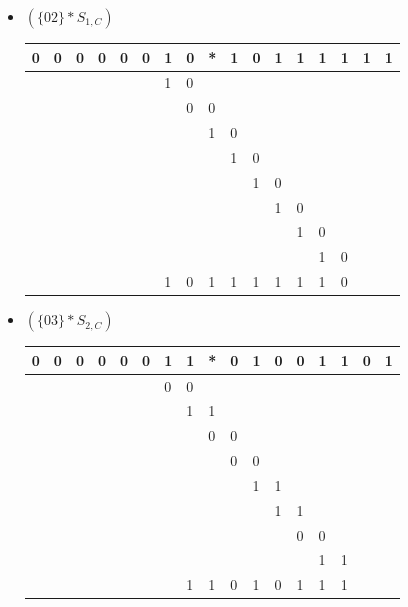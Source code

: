 \begin{itemize}
     \begin{itemize}
         \item $(\{02\} * S_{1,C})$
\begin{center}
\begin{tabular}{lllllllllllllllll}
0 & 0 & 0 & 0 & 0 & 0 & 1 & 0 & * & 1 & 0 & 1 & 1 & 1 & 1 & 1 & 1\\
\hline
 &  &  &  &  &  & 1 & 0 &  &  &  &  &  &  &  &  & \\
 &  &  &  &  &  &  & 0 & 0 &  &  &  &  &  &  &  & \\
 &  &  &  &  &  &  &  & 1 & 0 &  &  &  &  &  &  & \\
 &  &  &  &  &  &  &  &  & 1 & 0 &  &  &  &  &  & \\
 &  &  &  &  &  &  &  &  &  & 1 & 0 &  &  &  &  & \\
 &  &  &  &  &  &  &  &  &  &  & 1 & 0 &  &  &  & \\
 &  &  &  &  &  &  &  &  &  &  &  & 1 & 0 &  &  & \\
 &  &  &  &  &  &  &  &  &  &  &  &  & 1 & 0 &  & \\
 \hline
 &  &  &  &  &  & 1 & 0 & 1 & 1 & 1 & 1 & 1 & 1 & 0 &  & \\
         \end{tabular}
         \end{center}

        \item $(\{03\} * S_{2,C})$
        \begin{center}
\begin{tabular}{lllllllllllllllll}
0 & 0 & 0 & 0 & 0 & 0 & 1 & 1 & * & 0 & 1 & 0 & 0 & 1 & 1 & 0 & 1\\
\hline
 &  &  &  &  &  & 0 & 0 &  &  &  &  &  &  &  &  & \\
 &  &  &  &  &  &  & 1 & 1 &  &  &  &  &  &  &  & \\
 &  &  &  &  &  &  &  & 0 & 0 &  &  &  &  &  &  & \\
 &  &  &  &  &  &  &  &  & 0 & 0 &  &  &  &  &  & \\
 &  &  &  &  &  &  &  &  &  & 1 & 1 &  &  &  &  & \\
 &  &  &  &  &  &  &  &  &  &  & 1 & 1 &  &  &  & \\
 &  &  &  &  &  &  &  &  &  &  &  & 0 & 0 &  &  & \\
 &  &  &  &  &  &  &  &  &  &  &  &  & 1 & 1 &  & \\
 \hline
 &  &  &  &  &  &  & 1 & 1 & 0 & 1 & 0 & 1 & 1 & 1 &  &
         \end{tabular}
         \end{center}
       \end{itemize}


\end{itemize}
